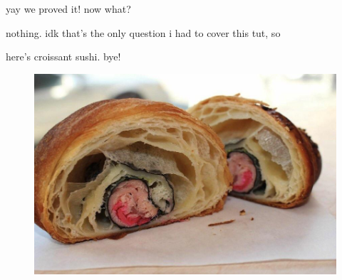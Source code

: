 \documentclass{beamer}
\begin{document}
\begin{frame}{yay we proved it! now what?}

nothing. idk that's the only question i had to cover this tut, so \emojimoyai

\vspace{2mm}

here's croissant sushi. bye! \emojisushi \emojisushi \emojicroissant \emojicroissant

\begin{figure}[h]
\centering
\includegraphics[scale=0.2]{img/croissant_sushi.png}
\end{figure}

\end{frame}
\end{document}
